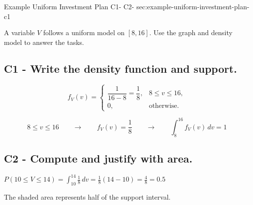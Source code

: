 	\sectionScored
	{Example Uniform Investment Plan}
	{C1- \hspace{2mm} C2-}
	{sec:example-uniform-investment-plan-c1}
	{
	A variable $V$ follows a uniform model on $[8,16]$. Use the graph and density model to answer the tasks.
	
	
	\label{subsec:example-uniform-investment-plan-c1-a}
	\subsection*{C1 - Write the density function and support. }
	
	\[
	f_V(v)=
	\begin{cases}
		\dfrac{1}{16-8}=\dfrac18, & 8\le v\le 16,\\
		0, & \text{otherwise.}
	\end{cases}
	\]
	
	\[
	8\le v\le 16
	\qquad \longrightarrow \qquad
	f_V(v)=\frac18
	\qquad \longrightarrow \qquad
	\int_8^{16} f_V(v)\,dv=1
	\]
	
	\vspace{-5mm}
	
	\label{subsec:example-uniform-investment-plan-c1-b}
	\subsection*{C2 - Compute  and justify with area. }
	
	\begin{minipage}[t]{0.42\textwidth}
		\vspace{0pt}
		\centering
	\end{minipage}
	\hfill
	\begin{minipage}[t]{0.54\textwidth}
		\vspace{0pt}
		\centering
		
		\(\displaystyle
		P(10\le V\le 14)
		=\int_{10}^{14}\frac18\,dv
		=\frac18(14-10)
		=\frac48
		=0.5
		\)
		
		\par\vspace{2mm}
		
		The shaded area represents half of the support interval.
	\end{minipage}
	
	}
	
